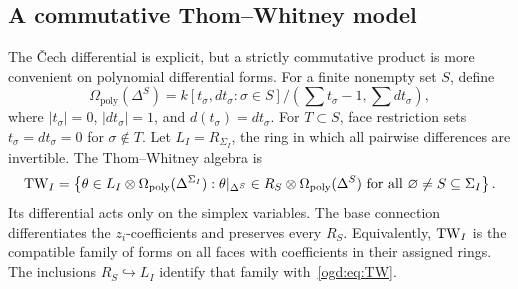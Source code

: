 \subsection{A commutative Thom--Whitney model}

The \v{C}ech differential is explicit, but a strictly commutative product is more convenient on polynomial differential forms.
For\label{ogd:def:polynomial-simplex-coefficients} a finite nonempty set \(S\), define
\[
 \Omega_{\mathrm{poly}}(\Delta^S)=
 k[t_\sigma,dt_\sigma:\sigma\in S]/
       (\textstyle\sum t_\sigma-1,\sum dt_\sigma),
\]
where \(|t_\sigma|=0\), \(|dt_\sigma|=1\), and \(d(t_\sigma)=dt_\sigma\).
For \(T\subset S\), face restriction sets \(t_\sigma=dt_\sigma=0\) for \(\sigma\notin T\).
Let \(L_I=R_{\Sigma_I}\), the ring in which all pairwise differences are invertible.
The Thom--Whitney algebra is
\begin{equation}\label{ogd:eq:TW}
 \operatorname{TW}_I=
 \left\{\theta\in L_I\otimes\Omega_{\mathrm{poly}}(\Delta^{\Sigma_I}):
 \theta|_{\Delta^S}\in R_S\otimes\Omega_{\mathrm{poly}}(\Delta^S)
 \text{ for all }\varnothing\ne S\subseteq\Sigma_I\right\}.
\end{equation}
Its differential acts only on the simplex variables.
The base connection differentiates the \(z_i\)-coefficients and preserves every \(R_S\).
Equivalently, \(\operatorname{TW}_I\) is the compatible family of forms on all faces with coefficients in their assigned rings.
The inclusions \(R_S\hookrightarrow L_I\) identify that family with~\eqref{ogd:eq:TW}.

